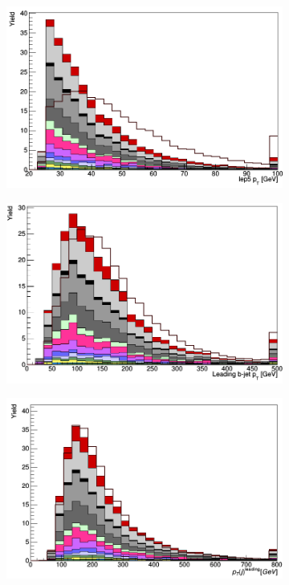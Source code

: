 \begin{figure}[H]
\begin{subfigure}{.5\textwidth}
\end{subfigure}%
\begin{subfigure}{.5\textwidth}
  \centering
  \includegraphics[width=.99\linewidth]{figs/features/jet_5_pt}
\end{subfigure}
\begin{subfigure}{.5\textwidth}
  \centering
  \includegraphics[width=.99\linewidth]{figs/features/leading_bjet_pT}
\end{subfigure}
\begin{subfigure}{.5\textwidth}
  \centering
  \includegraphics[width=.99\linewidth]{figs/features/leading_jet_pT}

\end{subfigure}
\end{figure}
